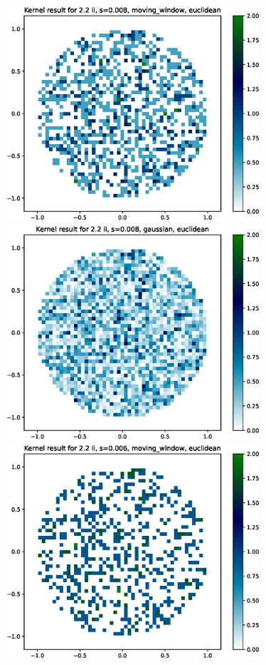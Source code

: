\documentclass{article}
\begin{document}
\hspace*{-1.5cm}\includegraphics[height=8cm]{comparisons//Kernel_result_2-2ii_s_0-008_moving_window_euclidean.eps} \hspace*{-1.5cm}
\includegraphics[height=8cm]{comparisons//Kernel_result_2-2ii_s_0-008_gaussian_euclidean.eps}  \\
\hspace*{-1.5cm}\includegraphics[height=8cm]{comparisons//Kernel_result_2-2ii_s_0-006_moving_window_euclidean.eps} \hspace*{-1.5cm}
\end{document}
